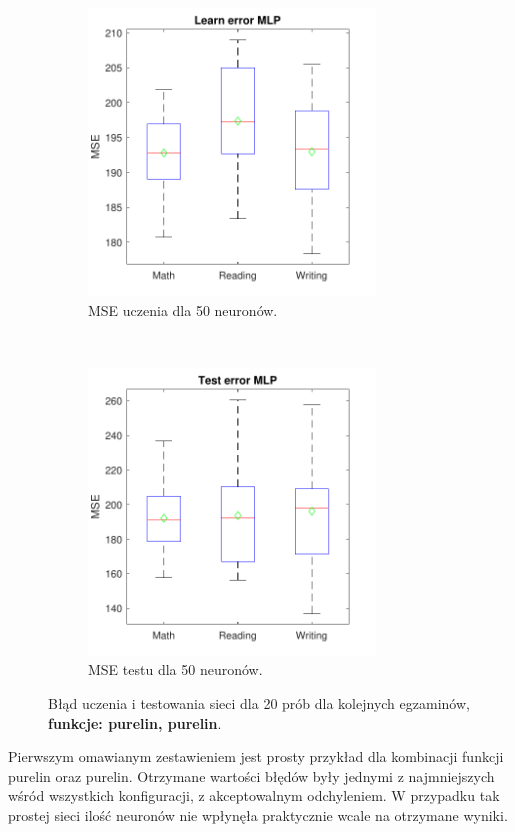 \documentclass[12pt]{article}
\begin{document}
\begin{figure}[H]
\begin{subfigure}[t]{0.48\textwidth} 
\centering
\includegraphics[height=3in]{purelin_purelin_50_learnBoxplot.pdf}
\caption{MSE uczenia dla 50 neuronów.}
\end{subfigure}
~~
\begin{subfigure}[t]{0.48\textwidth} 
\centering
\includegraphics[height=3in]{purelin_purelin_50_testBoxplot.pdf}
\caption{MSE testu dla 50 neuronów.}
\end{subfigure}
\caption{Błąd uczenia i testowania sieci dla 20 prób dla kolejnych egzaminów, \textbf{funkcje: purelin, purelin}.}
\end{figure}

Pierwszym omawianym zestawieniem jest prosty przykład dla kombinacji funkcji purelin oraz purelin. Otrzymane wartości błędów były jednymi z najmniejszych wśród wszystkich konfiguracji, z akceptowalnym odchyleniem. W przypadku tak prostej sieci ilość neuronów nie wpłynęła praktycznie wcale na otrzymane wyniki.
\end{document}
